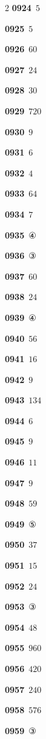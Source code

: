 \documentclass[10pt,a4paper]{article}
\begin{document}
\begin{multicols}{2}
\noindent\textbf{0924}\ $5$\par
\noindent\textbf{0925}\ $5$\par
\noindent\textbf{0926}\ $60$\par
\noindent\textbf{0927}\ $24$\par
\noindent\textbf{0928}\ $30$\par
\noindent\textbf{0929}\ $720$\par
\noindent\textbf{0930}\ $9$\par
\noindent\textbf{0931}\ $6$\par
\noindent\textbf{0932}\ $4$\par
\noindent\textbf{0933}\ $64$\par
\noindent\textbf{0934}\ $7$\par
\noindent\textbf{0935}\ ④\par
\noindent\textbf{0936}\ ③\par
\noindent\textbf{0937}\ $60$\par
\noindent\textbf{0938}\ $24$\par
\noindent\textbf{0939}\ ④\par
\noindent\textbf{0940}\ $56$\par
\noindent\textbf{0941}\ $16$\par
\noindent\textbf{0942}\ $9$\par
\noindent\textbf{0943}\ $134$\par
\noindent\textbf{0944}\ $6$\par
\noindent\textbf{0945}\ $9$\par
\noindent\textbf{0946}\ $11$\par
\noindent\textbf{0947}\ $9$\par
\noindent\textbf{0948}\ $59$\par
\noindent\textbf{0949}\ ⑤\par
\noindent\textbf{0950}\ $37$\par
\noindent\textbf{0951}\ $15$\par
\noindent\textbf{0952}\ $24$\par
\noindent\textbf{0953}\ ③\par
\noindent\textbf{0954}\ $48$\par
\noindent\textbf{0955}\ $960$\par
\noindent\textbf{0956}\ $420$\par
\noindent\textbf{0957}\ $240$\par
\noindent\textbf{0958}\ $576$\par
\noindent\textbf{0959}\ ③\par

\end{multicols}
\end{document}
